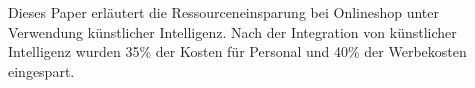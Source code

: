 Dieses Paper erläutert die Ressourceneinsparung bei Onlineshop unter Verwendung künstlicher Intelligenz. Nach der Integration von künstlicher Intelligenz wurden 35\% der Kosten für Personal und 40\% der Werbekosten eingespart.